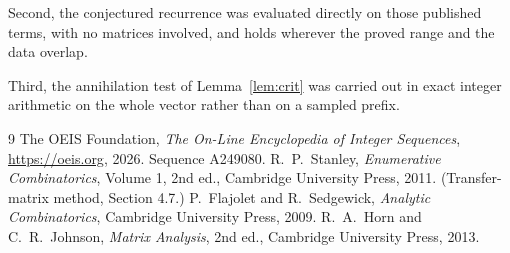 \documentclass[11pt,a4paper]{article}
\theoremstyle{plain}
\theoremstyle{definition}
\begin{document}
Second, the conjectured recurrence was evaluated directly on those published terms, with no
matrices involved, and holds wherever the proved range and the data overlap.

Third, the annihilation test of Lemma~\ref{lem:crit} was carried out in exact integer
arithmetic on the whole vector rather than on a sampled prefix.

\begin{thebibliography}{9}
 The OEIS Foundation, \emph{The On-Line Encyclopedia of Integer
Sequences}, \url{https://oeis.org}, 2026. Sequence A249080.
 R.~P.~Stanley, \emph{Enumerative Combinatorics}, Volume 1, 2nd ed.,
Cambridge University Press, 2011. (Transfer-matrix method, Section 4.7.)
 P.~Flajolet and R.~Sedgewick, \emph{Analytic Combinatorics}, Cambridge
University Press, 2009.
 R.~A.~Horn and C.~R.~Johnson, \emph{Matrix Analysis}, 2nd ed., Cambridge
University Press, 2013.
\end{thebibliography}
\end{document}
